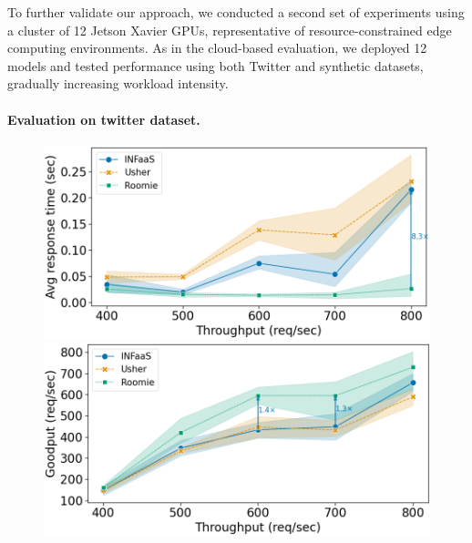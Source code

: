To further validate our approach, we conducted a second set of experiments using a cluster of 12 Jetson Xavier GPUs, representative of resource-constrained edge computing environments. As in the cloud-based evaluation, we deployed 12 models and tested performance using both Twitter and synthetic datasets, gradually increasing workload intensity.

\paragraph{Evaluation on twitter dataset.}

\begin{figure}
	\begin{minipage}[t]{.24\textwidth}
		\centering
		\includegraphics[width=\linewidth]{chapters/roomie/images/JetsonNano/twitter-all-models/response_time_line.png}
	\end{minipage}
	\hfill
	\begin{minipage}[t]{.24\textwidth}
		\centering
		\includegraphics[width=\textwidth]{chapters/roomie/images/JetsonNano/twitter-all-models/goodput_line.png}
	\end{minipage}
	\hfill
	\begin{minipage}[t]{.24\textwidth}

\end{minipage}
\end{figure}
